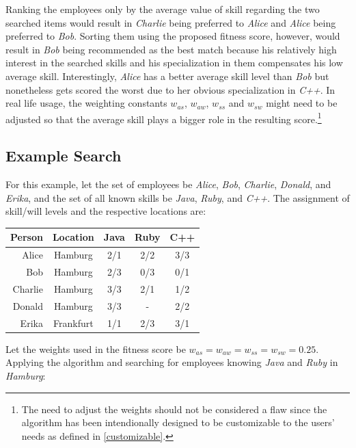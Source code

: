 Ranking the employees only by the average value of skill regarding the two searched items would result in \textit{Charlie} being preferred to \textit{Alice} and \textit{Alice} being preferred to \textit{Bob}. Sorting them using the proposed fitness score, however, would result in \textit{Bob} being recommended as the best match because his relatively high interest in the searched skills and his specialization in them compensates his low average skill. Interestingly, \textit{Alice} has a better average skill level than \textit{Bob} but nonetheless gets scored the worst due to her obvious specialization in \textit{C++}. In real life usage, the weighting constants $w_{as}$, $w_{aw}$, $w_{ss}$ and $ w_{sw}$ might need to be adjusted so that the average skill plays a bigger role in the resulting score.\footnote{The need to adjust the weights should not be considered a flaw since the algorithm has been intendionally designed to be customizable to the users' needs as defined in \ref{customizable}.}

\newpage
\subsection{Example Search}
For this example, let the set of employees be \textit{Alice}, \textit{Bob}, \textit{Charlie}, \textit{Donald}, and \textit{Erika}, and the set of all known skills be \textit{Java}, \textit{Ruby}, and \textit{C++}.
The assignment of skill/will levels and the respective locations are:
\newline
\begin{center}
\begin{tabular}{r|c|ccc}
  Person  & Location & Java & Ruby & C++ \\
  \hline
  Alice   & Hamburg   & 2/1 & 2/2 & 3/3 \\
  Bob     & Hamburg   & 2/3 & 0/3 & 0/1 \\
  Charlie & Hamburg   & 3/3 & 2/1 & 1/2 \\
  Donald  & Hamburg   & 3/3 &  -  & 2/2 \\
  Erika   & Frankfurt & 1/1 & 2/3 & 3/1 \\
\end{tabular}
\end{center}

Let the weights used in the fitness score be $w_{as} = w_{aw} = w_{ss} = w_{sw} = 0.25$.
Applying the algorithm and searching for employees knowing \textit{Java} and \textit{Ruby} in \textit{Hamburg}:\\

